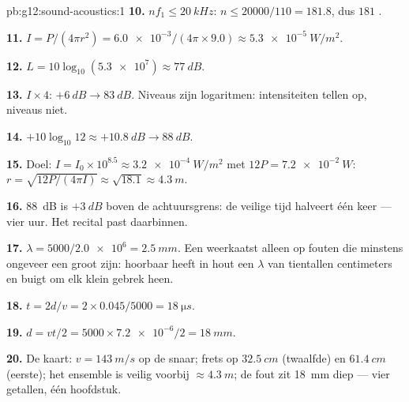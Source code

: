 \begin{solution}{pb:g12:sound-acoustics:1}
\textbf{10.} $nf_1 \le \qty{20}{kHz}$: $n \le 20000/110 = 181.8$, dus
$181$ .

\textbf{11.} $I = P/(4\pi r^2) = \num{6.0e-3}/(4\pi \times 9.0)
\approx \qty{5.3e-5}{W/m^2}$.

\textbf{12.} $L = 10\log_{10}(\num{5.3e7}) \approx \qty{77}{dB}$.

\textbf{13.} $I \times 4$: $+\qty{6}{dB} \to \qty{83}{dB}$. Niveaus zijn
logaritmen: intensiteiten tellen op, niveaus niet.

\textbf{14.} $+10\log_{10}12 \approx +\qty{10.8}{dB} \to \qty{88}{dB}$.

\textbf{15.} Doel: $I = I_0 \times 10^{8.5} \approx \qty{3.2e-4}{W/m^2}$
met $12P = \qty{7.2e-2}{W}$:
$r = \sqrt{12P/(4\pi I)} \approx \sqrt{18.1} \approx \qty{4.3}{m}$.

\textbf{16.} \qty{88}{dB} is $+\qty{3}{dB}$ boven de achtuursgrens: de
veilige tijd halveert één keer --- vier uur. Het recital past daarbinnen.

\textbf{17.} $\lambda = 5000/\num{2.0e6} = \qty{2.5}{mm}$. Een 
weerkaatst alleen op fouten die minstens ongeveer een  groot
zijn: hoorbaar  heeft in hout een $\lambda$ van tientallen
centimeters en buigt om elk klein gebrek heen.

\textbf{18.} $t = 2d/v = 2 \times 0.045/5000 = \qty{18}{\micro s}$.

\textbf{19.} $d = vt/2 = 5000 \times \num{7.2e-6}/2 = \qty{18}{mm}$.

\textbf{20.} De kaart: $v = \qty{143}{m/s}$ op de snaar; frets op
$\qty{32.5}{cm}$ (twaalfde) en $\qty{61.4}{cm}$ (eerste); het ensemble is
veilig voorbij $\approx \qty{4.3}{m}$; de fout zit \qty{18}{mm} diep ---
vier getallen, één hoofdstuk.
\end{solution}
